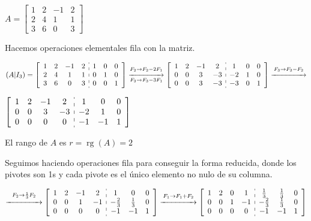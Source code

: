 \documentclass[12pt]{article}
\DeclareMathOperator{\rg}{rg}
\begin{document}
$A=\begin{bmatrix}
1 & 2 & -1 & 2 \\ 
2 & 4 & 1 & 1 \\ 
3 & 6 & 0 & 3
\end{bmatrix} $

Hacemos operaciones elementales fila con la matriz.

$(A|I_3)=\left[\begin{array}{cccc:ccc}
1 & 2 & -1 & 2 & 1 & 0 & 0 \\ 
2 & 4 & 1 & 1 & 0 & 1 & 0 \\ 
3 & 6 & 0 & 3 & 0 & 0 & 1
\end{array} \right]\overset{F_2\rightarrow
F_2-2F_1}{\underset{F_3\rightarrow
F_3-3F_1}{\xrightarrow{\hspace{1.5cm}}}}\left[\begin{array}{cccc:ccc}
1 & 2 & -1 & 2 & 1 & 0 & 0 \\ 
0 & 0 & 3 & -3 & -2 & 1 & 0 \\ 
0 & 0 & 3 & -3 & -3 & 0 & 1
\end{array} \right]\overset{F_3\rightarrow
F_3-F_2}{\xrightarrow{\hspace{1.5cm}}}$

$\left[\begin{array}{cccc:ccc}
1 & 2 & -1 & 2 & 1 & 0 & 0 \\ 
0 & 0 & 3 & -3 & -2 & 1 & 0 \\ 
0 & 0 & 0 & 0 & -1 & -1 & 1
\end{array} \right]$

El rango de $A$ es $r=\rg(A)=2$

Seguimos haciendo operaciones fila para conseguir la forma
reducida, donde los pivotes son 1s y cada pivote es el único
elemento no nulo de su columna.

$\overset{F_2\rightarrow
\frac{1}{3}F_2}{\xrightarrow{\hspace{1.5cm}}}\left[\begin{array}{cccc:ccc}
1 & 2 & -1 & 2 & 1 & 0 & 0 \\ 
0 & 0 & 1 & -1 & -\textstyle\frac{2}{3} & \textstyle\frac{1}{3}
& 0 \\
0 & 0 & 0 & 0 & -1 & -1 & 1
\end{array} \right]\overset{F_1\rightarrow
F_1+F_2}{\xrightarrow{\hspace{1.5cm}}}\left[\begin{array}{cccc:ccc}
1 & 2 & 0 & 1 & \textstyle\frac{1}{3} & \textstyle\frac{1}{3} &
0 \\
0 & 0 & 1 & -1 & \textstyle-\frac{2}{3} & \textstyle\frac{1}{3}
& 0 \\
0 & 0 & 0 & 0 & -1 & -1 & 1
\end{array} \right]$
\end{document}
